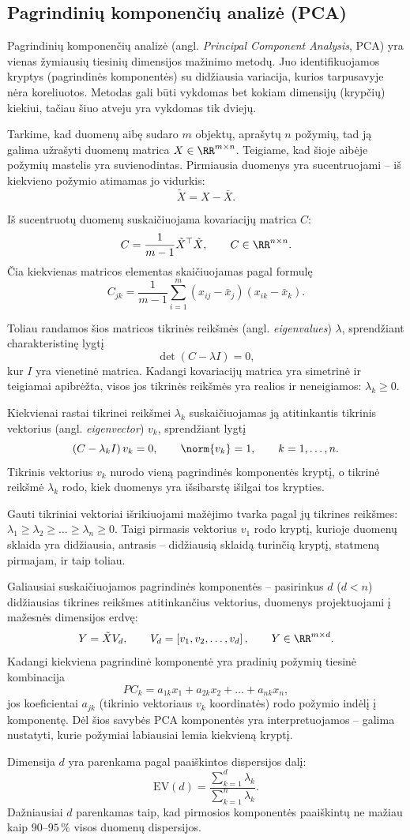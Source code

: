 \subsection{Pagrindinių komponenčių analizė (PCA)}

Pagrindinių komponenčių analizė (angl. \textit{Principal Component Analysis}, PCA) yra vienas žymiausių tiesinių dimensijos mažinimo metodų. Juo identifikuojamos kryptys (pagrindinės komponentės) su didžiausia variacija, kurios tarpusavyje nėra koreliuotos. Metodas gali būti vykdomas bet kokiam dimensijų (krypčių) kiekiui, tačiau šiuo atveju yra vykdomas tik dviejų.

Tarkime, kad duomenų aibę sudaro $m$ objektų, aprašytų $n$ požymių, tad ją galima užrašyti duomenų matrica $X \in \RR^{m \times n}$. Teigiame, kad šioje aibėje požymių mastelis yra suvienodintas. Pirmiausia duomenys yra sucentruojami -- iš kiekvieno požymio atimamas jo vidurkis:
\[
\tilde{X} = X - \bar{X}.
\]

Iš sucentruotų duomenų suskaičiuojama kovariacijų matrica $C$:
\[
C = \frac{1}{m-1}\tilde{X}^{\top}\tilde{X}, \qquad C \in \RR^{n \times n}.
\]
Čia kiekvienas matricos elementas skaičiuojamas pagal formulę
\[
C_{jk} = \frac{1}{m-1}\sum_{i=1}^{m}(x_{ij} - \bar{x}_j)(x_{ik} - \bar{x}_k).
\]

Toliau randamos šios matricos tikrinės reikšmės (angl. \textit{eigenvalues}) $\lambda$, sprendžiant charakteristinę lygtį
\[
\det\left(C - \lambda I\right) = 0,
\]
kur $I$ yra vienetinė matrica. Kadangi kovariacijų matrica yra simetrinė ir teigiamai apibrėžta, visos jos tikrinės reikšmės yra realios ir neneigiamos: $\lambda_k \geq 0$.

Kiekvienai rastai tikrinei reikšmei $\lambda_k$ suskaičiuojamas ją atitinkantis tikrinis vektorius (angl. \textit{eigenvector}) $v_k$, sprendžiant lygtį
\[
\left(C - \lambda_k I\right)v_k = 0, \qquad \norm{v_k} = 1, \qquad k = 1, \dots, n.
\]
Tikrinis vektorius $v_k$ nurodo vieną pagrindinės komponentės kryptį, o tikrinė reikšmė $\lambda_k$ rodo, kiek duomenys yra išsibarstę išilgai tos krypties.

Gauti tikriniai vektoriai išrikiuojami mažėjimo tvarka pagal jų tikrines reikšmes: $\lambda_1 \geq \lambda_2 \geq \dots \geq \lambda_n \geq 0$. Taigi pirmasis vektorius $v_1$ rodo kryptį, kurioje duomenų sklaida yra didžiausia, antrasis -- didžiausią sklaidą turinčią kryptį, statmeną pirmajam, ir taip toliau.

Galiausiai suskaičiuojamos pagrindinės komponentės -- pasirinkus $d$ ($d < n$) didžiausias tikrines reikšmes atitinkančius vektorius, duomenys projektuojami į mažesnės dimensijos erdvę:
\[
Y = \tilde{X} V_d, \qquad V_d = \left[ v_1, v_2, \dots, v_d \right], \qquad Y \in \RR^{m \times d}.
\]
Kadangi kiekviena pagrindinė komponentė yra pradinių požymių tiesinė kombinacija
\[
PC_k = a_{1k}x_1 + a_{2k}x_2 + \dots + a_{nk}x_n,
\]
jos koeficientai $a_{jk}$ (tikrinio vektoriaus $v_k$ koordinatės) rodo požymio indėlį į komponentę. Dėl šios savybės PCA komponentės yra interpretuojamos -- galima nustatyti, kurie požymiai labiausiai lemia kiekvieną kryptį.

Dimensija $d$ yra parenkama pagal paaiškintos dispersijos dalį:
\[
\mathrm{EV}(d) = \frac{\sum_{k=1}^{d} \lambda_k}{\sum_{k=1}^{n} \lambda_k}.
\]
Dažniausiai $d$ parenkamas taip, kad pirmosios komponentės paaiškintų ne mažiau kaip $90$--$95\,\%$ visos duomenų dispersijos.
